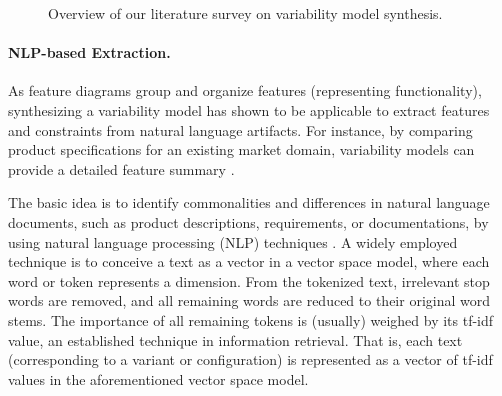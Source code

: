 \begin{figure}[h!]
\centering
{}
\caption{Overview of our literature survey on
variability model synthesis.}\label{fig:varsynth_overview}
\end{figure}
\paragraph{NLP-based Extraction.} As feature diagrams group and organize
features (representing functionality), synthesizing a variability model has shown to be applicable to extract features
and constraints from natural language artifacts. For instance, by comparing
product specifications for an existing market domain, variability models can
provide a detailed feature summary \citep{alves_exploratory_2008}.

The basic idea is to identify commonalities and differences in natural language
documents, such as product descriptions, requirements, or documentations, by
using natural language processing (NLP) techniques \citep{bakar_feature_2015}. A
widely employed technique is to conceive a text as a vector in a vector space model, where each word or
token represents a dimension. From the tokenized text, irrelevant stop words
are removed, and all remaining words are reduced to their original word stems.
The importance of all remaining tokens is (usually) weighed by its tf-idf
value, an established technique in information retrieval. That is, each text
(corresponding to a variant or configuration) is represented as a vector of
tf-idf values in the aforementioned vector space model. 

